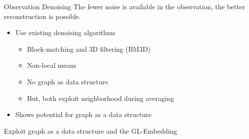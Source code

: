 




\begin{frame}{Observation Denoising}
  \alert<1>{The fewer noise is available in the observation, the better reconstruction is possible.}
  
  \pause
  \begin{itemize}
    \item Use existing denoising algorithms
    \begin{itemize}
      \item Block-matching and 3D filtering (BM3D) \cite{bm3d}
      \item Non-local means \cite{noneLocalMean}
      \item No graph as data structure
      \item But, both exploit neighborhood during averaging
    \end{itemize}
    \item<3-> \alert<3>{Shows potential for graph as a data structure}
  \end{itemize}

  \begin{tcolorbox}[colback=red!5!white,hide=<1-3>, alert=<4>, colframe=red!75!black]
    Exploit graph as a data structure and the GL-Embedding
\end{tcolorbox}

  
\end{frame}
